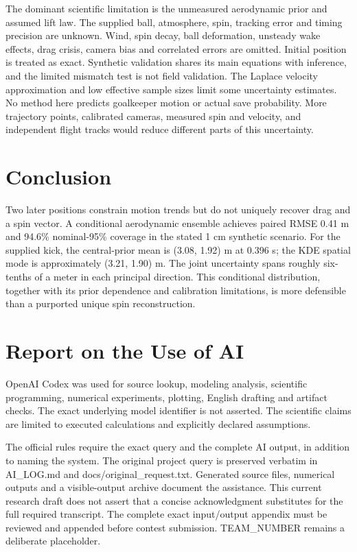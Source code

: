\documentclass[11pt,a4paper]{article}
\begin{document}
The dominant scientific limitation is the unmeasured aerodynamic prior and assumed lift law. The supplied ball, atmosphere, spin, tracking error and timing precision are unknown. Wind, spin decay, ball deformation, unsteady wake effects, drag crisis, camera bias and correlated errors are omitted. Initial position is treated as exact. Synthetic validation shares its main equations with inference, and the limited mismatch test is not field validation. The Laplace velocity approximation and low effective sample sizes limit some uncertainty estimates. No method here predicts goalkeeper motion or actual save probability. More trajectory points, calibrated cameras, measured spin and velocity, and independent flight tracks would reduce different parts of this uncertainty.

\section{Conclusion}
Two later positions constrain motion trends but do not uniquely recover drag and a spin vector. A conditional aerodynamic ensemble achieves paired RMSE 0.41 m and 94.6\% nominal-95\% coverage in the stated 1 cm synthetic scenario. For the supplied kick, the central-prior mean is (3.08, 1.92) m at 0.396 s; the KDE spatial mode is approximately (3.21, 1.90) m. The joint uncertainty spans roughly six-tenths of a meter in each principal direction. This conditional distribution, together with its prior dependence and calibration limitations, is more defensible than a purported unique spin reconstruction.

\clearpage


\section*{Report on the Use of AI}
OpenAI Codex was used for source lookup, modeling analysis, scientific programming, numerical experiments, plotting, English drafting and artifact checks. The exact underlying model identifier is not asserted. The scientific claims are limited to executed calculations and explicitly declared assumptions.

The official rules require the exact query and the complete AI output, in addition to naming the system.\cite{upcrules} The original project query is preserved verbatim in AI\_LOG.md and docs/original\_request.txt. Generated source files, numerical outputs and a visible-output archive document the assistance. This current research draft does not assert that a concise acknowledgment substitutes for the full required transcript. The complete exact input/output appendix must be reviewed and appended before contest submission. TEAM\_NUMBER remains a deliberate placeholder.
\end{document}
